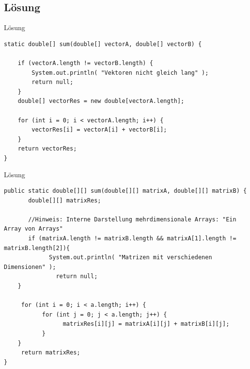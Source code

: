 \documentclass[18pt]{beamer}
\begin{document}
\subsection{Lösung}
\begin{frame}[fragile]{Lösung}
\begin{lstlisting}
static double[] sum(double[] vectorA, double[] vectorB) {
	
	if (vectorA.length != vectorB.length) {
		System.out.println( "Vektoren nicht gleich lang" );
		return null;
	}
	double[] vectorRes = new double[vectorA.length];
	
	for (int i = 0; i < vectorA.length; i++) {
		vectorRes[i] = vectorA[i] + vectorB[i];
	}
	return vectorRes;
}

\end{lstlisting}
\end{frame}

\begin{frame}[fragile]{Lösung}
\begin{lstlisting}[breaklines=false,basicstyle=\tiny]
public static double[][] sum(double[][] matrixA, double[][] matrixB) {
	   double[][] matrixRes;
	
	   //Hinweis: Interne Darstellung mehrdimensionale Arrays: "Ein Array von Arrays"
	   if (matrixA.length != matrixB.length && matrixA[1].length != matrixB.length[2]){
		   	 System.out.println( "Matrizen mit verschiedenen Dimensionen" );
			   return null;
	}
	
	 for (int i = 0; i < a.length; i++) {
		   for (int j = 0; j < a.length; j++) {
			     matrixRes[i][j] = matrixA[i][j] + matrixB[i][j];
		   }
	}
	 return matrixRes;
}
\end{lstlisting}
\end{frame}


\appendix
\beginbackup


\backupend
\end{document}
